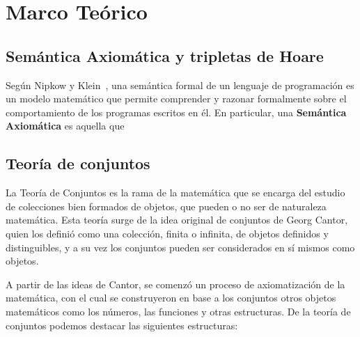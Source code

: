 \chapter{Marco Teórico}
\label{capitulo1}

\section{Semántica Axiomática y tripletas de Hoare}

Según Nipkow y Klein~\cite{concrete, ayj}, una semántica formal de un lenguaje de
programación es un modelo matemático que permite comprender y razonar
formalmente sobre el comportamiento de los programas escritos en él. En
particular, una \textbf{Semántica Axiomática} es aquella que

\section{Teoría de conjuntos}

La Teoría de Conjuntos es la rama de la matemática que se encarga del estudio de
colecciones bien formados de objetos, que pueden o no ser de naturaleza
matemática. Esta teoría surge de la idea original de conjuntos de Georg Cantor,
quien los definió como una colección, finita o infinita, de objetos definidos y
distinguibles, y a su vez los conjuntos pueden ser considerados en sí mismos
como objetos.

A partir de las ideas de Cantor, se comenzó un proceso de axiomatización de la
matemática, con el cual se construyeron en base a los conjuntos otros objetos
matemáticos como los números, las funciones y otras estructuras. De la teoría de
conjuntos podemos destacar las siguientes estructuras:

